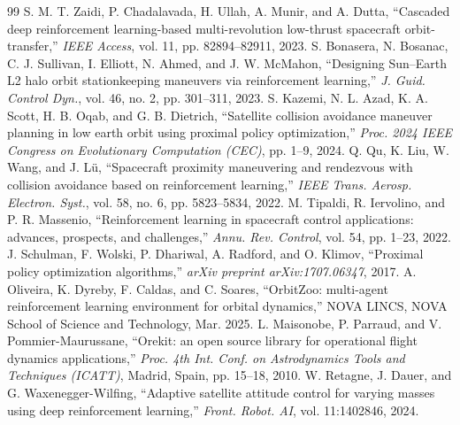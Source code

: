 \documentclass[paper]{ieice}
\begin{document}
%
%

\begin{thebibliography}{99}
S. M. T. Zaidi, P. Chadalavada, H. Ullah, A. Munir, and A. Dutta, ``Cascaded deep reinforcement learning-based multi-revolution low-thrust spacecraft orbit-transfer,'' \textit{IEEE Access}, vol. 11, pp. 82894--82911, 2023. %
S. Bonasera, N. Bosanac, C. J. Sullivan, I. Elliott, N. Ahmed, and J. W. McMahon, ``Designing Sun--Earth L2 halo orbit stationkeeping maneuvers via reinforcement learning,'' \textit{J. Guid. Control Dyn.}, vol. 46, no. 2, pp. 301--311, 2023. %
S. Kazemi, N. L. Azad, K. A. Scott, H. B. Oqab, and G. B. Dietrich, ``Satellite collision avoidance maneuver planning in low earth orbit using proximal policy optimization,'' \textit{Proc. 2024 IEEE Congress on Evolutionary Computation (CEC)}, pp. 1--9, 2024. %
Q. Qu, K. Liu, W. Wang, and J. L\"{u}, ``Spacecraft proximity maneuvering and rendezvous with collision avoidance based on reinforcement learning,'' \textit{IEEE Trans. Aerosp. Electron. Syst.}, vol. 58, no. 6, pp. 5823--5834, 2022. %
M. Tipaldi, R. Iervolino, and P. R. Massenio, ``Reinforcement learning in spacecraft control applications: advances, prospects, and challenges,'' \textit{Annu. Rev. Control}, vol. 54, pp. 1--23, 2022. %
J. Schulman, F. Wolski, P. Dhariwal, A. Radford, and O. Klimov, ``Proximal policy optimization algorithms,'' \textit{arXiv preprint arXiv:1707.06347}, 2017.
A. Oliveira, K. Dyreby, F. Caldas, and C. Soares, ``OrbitZoo: multi-agent reinforcement learning environment for orbital dynamics,'' NOVA LINCS, NOVA School of Science and Technology, Mar. 2025.
L. Maisonobe, P. Parraud, and V. Pommier-Maurussane, ``Orekit: an open source library for operational flight dynamics applications,'' \textit{Proc. 4th Int. Conf. on Astrodynamics Tools and Techniques (ICATT)}, Madrid, Spain, pp. 15--18, 2010.
W. Retagne, J. Dauer, and G. Waxenegger-Wilfing, ``Adaptive satellite attitude control for varying masses using deep reinforcement learning,'' \textit{Front. Robot. AI}, vol. 11:1402846, 2024. %


\end{thebibliography}
\end{document}
